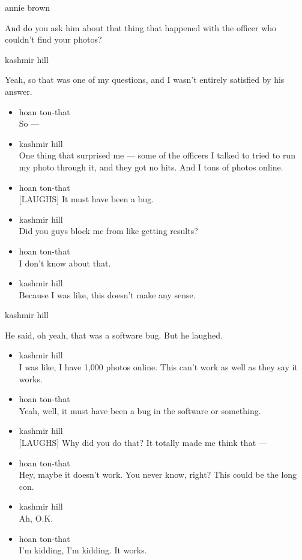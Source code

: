 annie brown

And do you ask him about that thing that happened with the officer who
couldn't find your photos?

kashmir hill

Yeah, so that was one of my questions, and I wasn't entirely satisfied
by his answer.

\begin{itemize}
\item
  hoan ton-that\\
  So ---
\item
  kashmir hill\\
  One thing that surprised me --- some of the officers I talked to tried
  to run my photo through it, and they got no hits. And I tons of photos
  online.
\item
  hoan ton-that\\
  {[}LAUGHS{]} It must have been a bug.
\item
  kashmir hill\\
  Did you guys block me from like getting results?
\item
  hoan ton-that\\
  I don't know about that.
\item
  kashmir hill\\
  Because I was like, this doesn't make any sense.
\end{itemize}

kashmir hill

He said, oh yeah, that was a software bug. But he laughed.

\begin{itemize}
\item
  kashmir hill\\
  I was like, I have 1,000 photos online. This can't work as well as
  they say it works.
\item
  hoan ton-that\\
  Yeah, well, it must have been a bug in the software or something.
\item
  kashmir hill\\
  {[}LAUGHS{]} Why did you do that? It totally made me think that ---
\item
  hoan ton-that\\
  Hey, maybe it doesn't work. You never know, right? This could be the
  long con.
\item
  kashmir hill\\
  Ah, O.K.
\item
  hoan ton-that\\
  I'm kidding, I'm kidding. It works.
\end{itemize}

